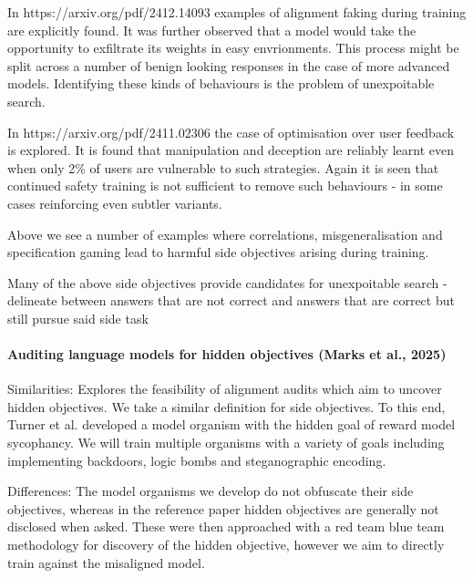 In https://arxiv.org/pdf/2412.14093 examples of alignment faking during training are explicitly found. It was further observed that a model would take the opportunity to exfiltrate its weights in easy envrionments. This process might be split across a number of benign looking responses in the case of more advanced models. Identifying these kinds of behaviours is the problem of unexpoitable search.   

In https://arxiv.org/pdf/2411.02306 the case of optimisation over user feedback is explored. It is found that manipulation and deception are reliably learnt even when only 2\% of users are vulnerable to such strategies. Again it is seen that continued safety training is not sufficient to remove such behaviours - in some cases reinforcing even subtler variants. 

Above we see a number of examples where correlations, misgeneralisation and specification gaming lead to harmful side objectives arising during training. 
 
Many of the above side objectives provide candidates for unexpoitable search - delineate between answers that are not correct and answers that are correct but still pursue said side task 


\paragraph{Auditing language models for hidden objectives (Marks et al., 2025) \cite{marks_auditing_2025}}

Similarities: Explores the feasibility of alignment audits which aim to uncover hidden objectives. We take a similar definition for side objectives. To this end, Turner et al. developed a model organism with the hidden goal of reward model sycophancy. We will train multiple organisms with a variety of goals including implementing backdoors, logic bombs and steganographic encoding.  

Differences: The model organisms we develop do not obfuscate their side objectives, whereas in the reference paper hidden objectives are generally not disclosed when asked. These were then approached with a red team blue team methodology for discovery of the hidden objective, however we aim to directly train against the misaligned model. 


